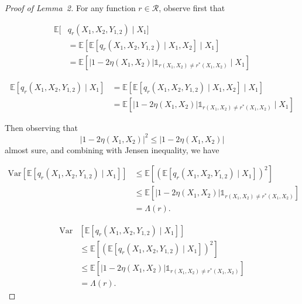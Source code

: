 \documentclass[letterpaper]{article} %
\def\DoubleColumn{}
\def\DoubleColumnEnd{}
\def\SingleColumn{}
\def\SingleColumnEnd{}
\newcommand{\E}{\mathbb{E}}
\newcommand{\Var}{\text{Var}}
\newcommand{\indicator}{\mathds 1}
\begin{document}
\begin{proof}[Proof of Lemma~2] %
    For any function $r\in\mathcal{R}$, observe first that
    \DoubleColumn
    \begin{align*}
        \E[&q_r(X_1,X_2,Y_{1,2})\mid X_1]\\
        &= \E[\E[q_r(X_1,X_2,Y_{1,2})\mid X_1,X_2]\mid X_1]\\
        &= \E[|1-2\eta(X_1,X_2)|\indicator{}_{r(X_1,X_2)\neq r^*(X_1,X_2)}\mid X_1]
    \end{align*}
    \DoubleColumnEnd
    \SingleColumn
    \begin{align*}
        \E[q_r(X_1,X_2,Y_{1,2})\mid X_1]&= \E[\E[q_r(X_1,X_2,Y_{1,2})\mid X_1,X_2]\mid X_1]\\
        &= \E[|1-2\eta(X_1,X_2)|\indicator{}_{r(X_1,X_2)\neq r^*(X_1,X_2)}\mid X_1]
    \end{align*}
    \SingleColumnEnd
    Then observing that
    \[|1-2\eta(X_1,X_2)|^2\le |1-2\eta(X_1,X_2)|\]
    almost sure, and combining with Jensen inequality, we have
    \SingleColumn
    \begin{align*}
        \Var[\E[q_r(X_1,X_2,Y_{1,2})\mid X_1]] & \le \E[(\E[q_r(X_1,X_2,Y_{1,2})\mid X_1])^2]\\
        &\le \E[|1-2\eta(X_1,X_2)|\indicator{}_{r(X_1,X_2)\neq r^*(X_1,X_2)}]\\
        &= \Lambda(r).
    \end{align*}
    \SingleColumnEnd
    \DoubleColumn
    \begin{align*}
        \Var&[\E[q_r(X_1,X_2,Y_{1,2})\mid X_1]] \\
        & \le \E[(\E[q_r(X_1,X_2,Y_{1,2})\mid X_1])^2]\\
        &\le \E[|1-2\eta(X_1,X_2)|\indicator{}_{r(X_1,X_2)\neq r^*(X_1,X_2)}]\\
        &= \Lambda(r).
    \end{align*}
    \DoubleColumnEnd
\end{proof}
\end{document}
